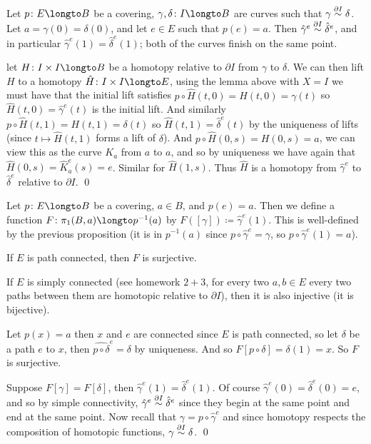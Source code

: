 \bprop

    Let $p\colon E\longto B$ be a covering, $\gamma,\delta\colon I\longto B$ are curves such that $\gamma\hdi\delta$.
    Let $a=\gamma(0)=\delta(0)$, and let $e\in E$ such that $p(e)=a$.
    Then $\hat\gamma^e\hdi\hat\delta^e$, and in particular $\hat\gamma^e(1)=\hat\delta^e(1)$; both of the curves finish on the same point.

\eprop

\Proof let $H\colon I\times I\longto B$ be a homotopy relative to $\partial I$ from $\gamma$ to $\delta$.
We can then lift $H$ to a homotopy $\hat H\colon I\times I\longto E$, using the lemma above with $X=I$ we must have that the initial lift satisfies $p\circ\hat H(t,0)=H(t,0)=\gamma(t)$ so
$\hat H(t,0)=\hat\gamma^e(t)$ is the initial lift.
And similarly $p\circ\hat H(t,1)=H(t,1)=\delta(t)$ so $\hat H(t,1)=\hat\delta^e(t)$ by the uniqueness of lifts (since $t\mapsto\hat H(t,1)$ forms a lift of $\delta$).
And $p\circ\hat H(0,s)=H(0,s)=a$, we can view this as the curve $K_a$ from $a$ to $a$, and so by uniqueness we have again that $\hat H(0,s)=\hat K_a^e(s)=e$.
Similar for $\hat H(1,s)$.
Thus $\hat H$ is a homotopy from $\hat\gamma^e$ to $\hat\delta^e$ relative to $\partial I$.
\qed

Let $p\colon E\longto B$ be a covering, $a\in B$, and $p(e)=a$.
Then we define a function $F\colon\pi_1(B,a)\longto p^{-1}(a)$ by $F([\gamma])\coloneqq\hat\gamma^e(1)$.
This is well-defined by the previous proposition (it is in $p^{-1}(a)$ since $p\circ\hat\gamma^e=\gamma$, so $p\circ\hat\gamma^e(1)=a$).

\bprop

    \benum
        \item If $E$ is path connected, then $F$ is surjective.
        \item If $E$ is simply connected (see homework $2+3$, for every two $a,b\in E$ every two paths between them are homotopic relative to $\partial I$), then it is also injective (it is bijective).
    \eenum

\eprop

\Proof
\benum
    \item Let $p(x)=a$ then $x$ and $e$ are connected since $E$ is path connected, so let $\delta$ be a path $e$ to $x$, then $\widehat{p\circ\delta}^e=\delta$ by uniqueness.
        And so $F[p\circ\delta]=\delta(1)=x$.
        So $F$ is surjective.
    \item Suppose $F[\gamma]=F[\delta]$, then $\hat\gamma^e(1)=\hat\delta^e(1)$.
        Of course $\hat\gamma^e(0)=\hat\delta^e(0)=e$, and so by simple connectivity, $\hat\gamma^e\hdi\hat\delta^e$ since they begin at the same point and end at the same point.
        Now recall that $\gamma=p\circ\hat\gamma^e$ and since homotopy respects the composition of homotopic functions, $\gamma\hdi\delta$.
        \qed
\eenum

